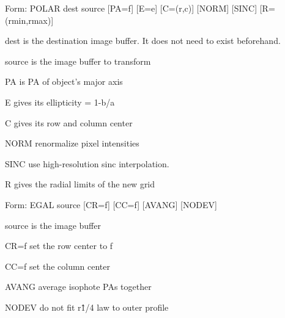 {\newpage\clearpage
{}%
\begin{command}
  \item[Form: POLAR dest source {[PA=f]} {[E=e]} {[C=(r,c)]} {[NORM]} 
       {[SINC]} {[R=(rmin,rmax)]}\hfill]{}
  \item[dest]{is the destination image buffer. It does not need
       to exist beforehand.}
  \item[source]{is the image buffer to transform}
  \item[PA]{is PA of object's major axis}
  \item[E]{gives its ellipticity = 1-b/a}
  \item[C]{gives its row and column center}
  \item[NORM]{renormalize pixel intensities}
  \item[SINC]{use high-resolution sinc interpolation.}
  \item[R]{gives the radial limits of the new grid}
\end{command}%
\lthtmlfigureZ
\lthtmlcheckvsize\clearpage}

{\newpage\clearpage
{}%
\begin{command}
  \item[Form: EGAL source {[CR=f]} {[CC=f]} {[AVANG]} {[NODEV]}\hfill]{}
  \item[source]{is the image buffer}
  \item[CR=f]{set the row center to f}
  \item[CC=f]{set the column center}
  \item[AVANG]{average isophote PAs together}
  \item[NODEV]{do not fit r\^1/4 law to outer profile}
\end{command}%
\lthtmlfigureZ
\lthtmlcheckvsize\clearpage}

